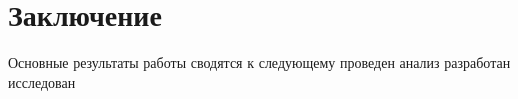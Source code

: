 \chapter{Заключение}
Основные результаты работы сводятся к следующему
 проведен анализ
 разработан
 исследован

